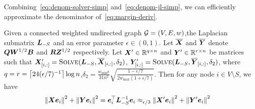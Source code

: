 \documentclass[sigconf]{acmart}
\begin{document}
Combining~\eqref{eq:denom-solver-simp} and~\eqref{eq:denom-jl-simp}, we can efficiently approximate the denominator of~\eqref{eq:margin-deriv}.
\begin{lemma}\label{lem:approx-denom}
    Given a connected weighted undirected graph \(\mathcal{G}=(V,E,w)\),the Laplacian submatrix \(\boldsymbol{L}_{-S}\) and an error parameter \(\epsilon\in(0,1)\).
    Let \(\overline{\boldsymbol{X}}\) and \(\overline{\boldsymbol{Y}}\) denote \(\boldsymbol{Q}\boldsymbol{W}^{1/2}\boldsymbol{B}\) and \(\boldsymbol{R}\boldsymbol{Z}^{1/2}\) respectively.
    Let \(\boldsymbol{X}'\in\mathbb{R}^{q\times n}\) and \(\boldsymbol{Y}'\in\mathbb{R}^{r\times n}\) be matrices such that \(\boldsymbol{X}'_{[i,:]}=\textsc{Solve}(\boldsymbol{L}_{-S},\overline{\boldsymbol{X}}_{[i,:]},\delta_2)\), \(\boldsymbol{Y}'_{[i,:]}=\textsc{Solve}(\boldsymbol{L}_{-S},\overline{\boldsymbol{Y}}_{[i,:]},\delta_2)\), where \(q=r=\left\lceil24(\epsilon/7)^{-1}\right\rceil\log n\),\(\delta_2=\frac{w_{\min}\epsilon}{31n^2}\sqrt{\frac{1-\epsilon/7}{2w_{\max}(1+\epsilon/7)}}\). Then for any node \(i\in V\setminus S\), we have
    \begin{equation}\label{eq:approx-denom}
        \left\Vert\boldsymbol{X}\boldsymbol{e}_i\right\Vert^2+\left\Vert\boldsymbol{Y}\boldsymbol{e}_i\right\Vert^2=\boldsymbol{e}_i^\top\boldsymbol{L}_{-S}^{-1}\boldsymbol{e}_i\approx_{\epsilon/3}\left\Vert\boldsymbol{X}'\boldsymbol{e}_i\right\Vert^2+\left\Vert\boldsymbol{Y}'\boldsymbol{e}_i\right\Vert^2
    \end{equation}
\end{lemma}
\end{document}
